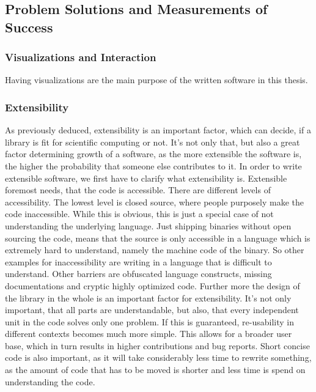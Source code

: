 \subsection{Problem Solutions and Measurements of Success}

\subsubsection{Visualizations and Interaction}

Having visualizations are the main purpose of the written software in this thesis.


\subsubsection{Extensibility}
As previously deduced, extensibility is an important factor, which can decide, if a library is fit for scientific computing or not. 
It's not only that, but also a great factor determining growth of a software, as the more extensible the software is, the higher the probability that someone else contributes to it.
In order to write extensible software, we first have to clarify what extensibility is.
Extensible foremost needs, that the code is accessible. There are different levels of accessibility. The lowest level is closed source, where people purposely make the code inaccessible. While this is obvious, this is just a special case of not understanding the underlying language. Just shipping binaries without open sourcing the code, means that the source is only accessible in a language which is extremely hard to understand, namely the machine code of the binary. So other examples for inaccessibility are writing in a language that is difficult to understand. Other barriers are obfuscated language constructs, missing documentations and cryptic highly optimized code.
Further more the design of the library in the whole is an important factor for extensibility. It's not only important, that all parts are understandable, but also, that every independent unit in the code solves only one problem. 
If this is guaranteed, re-usability in different contexts becomes much more simple. This allows for a broader user base, which in turn results in higher contributions and bug reports. 
Short concise code is also important, as it will take considerably less time to rewrite something, as the amount of code that has to be moved is shorter and less time is spend on understanding the code.

